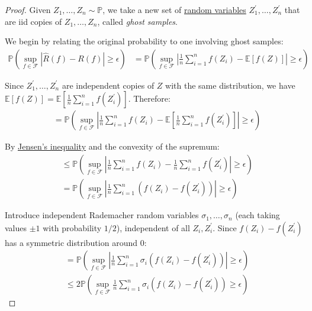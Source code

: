   \begin{proof}
    Given $Z_1, \ldots, Z_n \sim \mathbb{P}$, we take a new set of \hyperref[prob-def:random-variable]{random variables} $Z_1^{\prime}, \ldots, Z_n^{\prime}$ that are iid copies of $Z_1, \ldots, Z_n$, called \textit{ghost samples}.
   
    We begin by relating the original probability to one involving ghost samples:
    \begin{align}
      \mathbb{P} \left( \sup_{f \in \mathcal{F}} | \hat{R}(f) - R(f) | \geq \epsilon \right) &= \mathbb{P} \left( \sup_{f \in \mathcal{F}} \left| \frac{1}{n} \sum_{i=1}^n f(Z_i) - \mathbb{E}[f(Z)] \right| \geq \epsilon \right)
    \end{align}
   
    Since $Z_1^{\prime}, \ldots, Z_n^{\prime}$ are independent copies of $Z$ with the same distribution, we have $\mathbb{E}[f(Z)] = \mathbb{E}\left[\frac{1}{n} \sum_{i=1}^n f(Z_i^{\prime})\right]$. Therefore:
    \begin{align}
      &= \mathbb{P} \left( \sup_{f \in \mathcal{F}} \left| \frac{1}{n} \sum_{i=1}^n f(Z_i) - \mathbb{E}\left[\frac{1}{n} \sum_{i=1}^n f(Z_i^{\prime})\right] \right| \geq \epsilon \right)
    \end{align}
   
    By \hyperref[com-thm:jensens-inequality]{Jensen's inequality} and the convexity of the supremum:
    \begin{align}
      &\leq \mathbb{P} \left( \sup_{f \in \mathcal{F}} \left| \frac{1}{n} \sum_{i=1}^n f(Z_i) - \frac{1}{n} \sum_{i=1}^n f(Z_i^{\prime}) \right| \geq \epsilon \right)\\
      &= \mathbb{P} \left( \sup_{f \in \mathcal{F}} \left| \frac{1}{n} \sum_{i=1}^n (f(Z_i) - f(Z_i^{\prime})) \right| \geq \epsilon \right)
    \end{align}
   
    Introduce independent Rademacher random variables $\sigma_1, \ldots, \sigma_n$ (each taking values $\pm 1$ with probability $1/2$), independent of all $Z_i, Z_i^{\prime}$. Since $f(Z_i) - f(Z_i^{\prime})$ has a symmetric distribution around 0:
    \begin{align}
      &= \mathbb{P} \left( \sup_{f \in \mathcal{F}} \left| \frac{1}{n} \sum_{i=1}^n \sigma_i (f(Z_i) - f(Z_i^{\prime})) \right| \geq \epsilon \right)\\
      &\leq 2\mathbb{P} \left( \sup_{f \in \mathcal{F}} \frac{1}{n} \sum_{i=1}^n \sigma_i (f(Z_i) - f(Z_i^{\prime})) \geq \epsilon \right)
    \end{align}
   

\end{proof}
